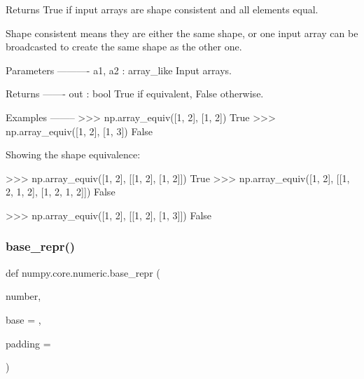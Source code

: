 \begin{DoxyVerb}Returns True if input arrays are shape consistent and all elements equal.

Shape consistent means they are either the same shape, or one input array
can be broadcasted to create the same shape as the other one.

Parameters
----------
a1, a2 : array_like
    Input arrays.

Returns
-------
out : bool
    True if equivalent, False otherwise.

Examples
--------
>>> np.array_equiv([1, 2], [1, 2])
True
>>> np.array_equiv([1, 2], [1, 3])
False

Showing the shape equivalence:

>>> np.array_equiv([1, 2], [[1, 2], [1, 2]])
True
>>> np.array_equiv([1, 2], [[1, 2, 1, 2], [1, 2, 1, 2]])
False

>>> np.array_equiv([1, 2], [[1, 2], [1, 3]])
False\end{DoxyVerb}
 \mbox{\label{namespacenumpy_1_1core_1_1numeric_a30faf8e5c0748ef6178c0c588756d7a9}} 
\subsubsection{\texorpdfstring{base\+\_\+repr()}{base\_repr()}}
{\footnotesize\ttfamily def numpy.\+core.\+numeric.\+base\+\_\+repr (\begin{DoxyParamCaption}\item[{}]{number,  }\item[{}]{base = {},  }\item[{}]{padding = {} }\end{DoxyParamCaption})}

